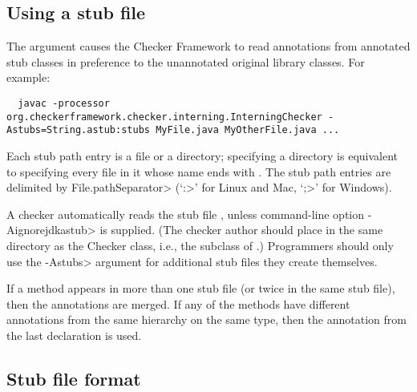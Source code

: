 

\subsection{Using a stub file\label{stub-using}}

The  argument causes the Checker Framework to read
annotations from annotated stub classes in preference to the unannotated
original library classes.  For example:

\begin{smaller}
\begin{Verbatim}
  javac -processor org.checkerframework.checker.interning.InterningChecker -Astubs=String.astub:stubs MyFile.java MyOtherFile.java ...
\end{Verbatim}
\end{smaller}

Each stub path entry is a file or a directory; specifying a directory is
equivalent to specifying every file in it whose name ends with
.  The stub path entries are delimited by
\<File.pathSeparator> (`\<:>' for Linux and Mac, `\<;>' for Windows).

A checker automatically reads the stub file , unless
command-line option \<-Aignorejdkastub> is supplied.  (The checker
author should place  in the same directory as the Checker class, i.e.,
the subclass of .)  Programmers should only use the
\<-Astubs> argument for additional stub files they create themselves.

If a method appears in more than one stub file (or twice in the same 
stub file), then the annotations are merged. If any of the 
methods have different annotations from the same hierarchy on the same type,
then the annotation from the last declaration is used.  




\subsection{Stub file format\label{stub-format}}


